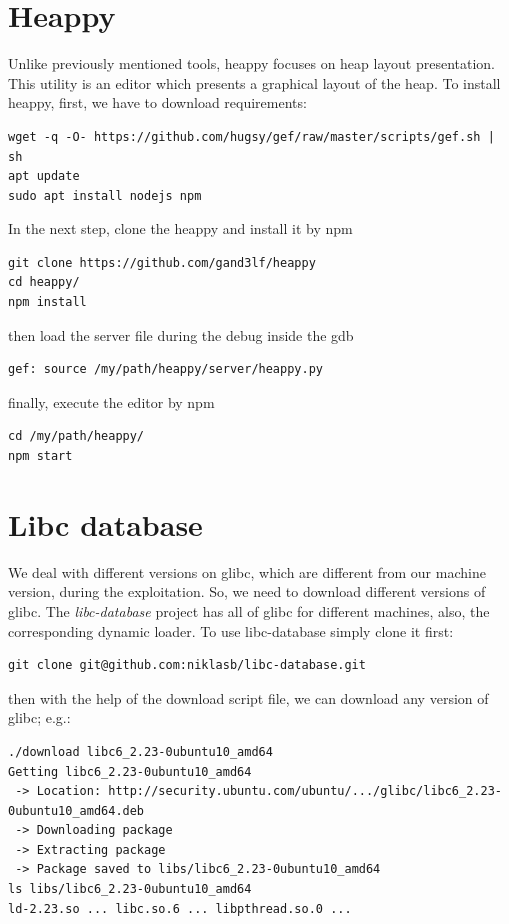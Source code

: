 \documentclass{masterthesis}
\newcommand*\libc{glibc}
\begin{document}
\section{Heappy}
\label{sect:heappy}
Unlike previously mentioned tools, heappy focuses on heap layout presentation. This utility is an editor which presents a graphical layout of the heap. To install heappy, first, we have to download requirements:

\begin{lstlisting}[frame=tlrb]
wget -q -O- https://github.com/hugsy/gef/raw/master/scripts/gef.sh | sh
apt update
sudo apt install nodejs npm
\end{lstlisting}

In the next step, clone the heappy and install it by npm

\begin{lstlisting}[frame=tlrb]
git clone https://github.com/gand3lf/heappy
cd heappy/
npm install
\end{lstlisting}

then load the server file during the debug inside the gdb
\begin{lstlisting}[frame=tlrb]
gef: source /my/path/heappy/server/heappy.py
\end{lstlisting}

finally, execute the editor by npm

\begin{lstlisting}[frame=tlrb]
cd /my/path/heappy/
npm start
\end{lstlisting}


\section{Libc database}
\label{sect:LibcDatabase}
We deal with different versions on \libc{}, which are different from our machine version, during the exploitation. So, we need to download different versions of \libc{}. The \emph{libc-database} project has all of \libc{} for different machines, also, the corresponding dynamic loader. To use libc-database simply clone it first:
\begin{lstlisting}[frame=tlrb]
git clone git@github.com:niklasb/libc-database.git
\end{lstlisting}
then with the help of the download script file, we can download any version of \libc{}; e.g.:
\begin{lstlisting}[frame=tlrb]
./download libc6_2.23-0ubuntu10_amd64
Getting libc6_2.23-0ubuntu10_amd64
 -> Location: http://security.ubuntu.com/ubuntu/.../glibc/libc6_2.23-0ubuntu10_amd64.deb
 -> Downloading package
 -> Extracting package
 -> Package saved to libs/libc6_2.23-0ubuntu10_amd64
ls libs/libc6_2.23-0ubuntu10_amd64
ld-2.23.so ... libc.so.6 ... libpthread.so.0 ...
\end{lstlisting}
\end{document}
